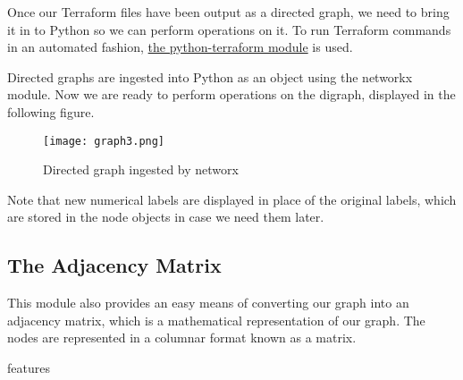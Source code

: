 \justifying
Once our Terraform files have been output as a directed graph, we need to bring it in to Python so we can
perform operations on it. To run Terraform commands in an automated fashion, \href{https://pypi.org/project/python-terraform/}{the python-terraform module}
is used.

\justifying
Directed graphs are ingested into Python as an object using the networkx module. Now we are ready to
perform operations on the digraph, displayed in the following figure.

\justifying
\begin{figure}[H]
    \texttt{[image: graph3.png]}
    \caption{Directed graph ingested by networx}
    \label{digraph}
\end{figure}

Note that new numerical labels are displayed in place of the original labels, which are
stored in the node objects in case we need them later.

\subsection{\label{sec:adjacency}The Adjacency Matrix}

This module also provides
an easy means of converting our graph into an adjacency matrix, which is a mathematical representation of
our graph. The nodes are represented in a columnar format known as a matrix.


features


\clearpage
\begin{versionhistory}
\end{versionhistory}
\nocite{*}




